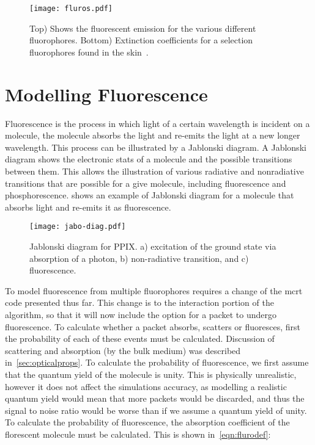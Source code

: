 

\begin{figure}[!htbp]
  \centering
  \texttt{[image: fluros.pdf]}
  \caption{Top) Shows the fluorescent emission for the various different fluorophores. Bottom) Extinction coefficients for a selection fluorophores found in the skin~\cite{prahltyro,prahltryto,soltani2019deep,sun2012biomarkers,islam2013ph,evans2013magnetic,von2012fluorescence}.}
  \label{fig:flurosshow}
\end{figure}
\FloatBarrier

\section{Modelling Fluorescence}

Fluorescence is the process in which light of a certain wavelength is incident on a molecule, the molecule absorbs the light and re-emits the light at a new longer wavelength.
This process can be illustrated by a Jablonski diagram.
A Jablonski diagram shows the electronic stats of a molecule and the possible transitions between them.
This allows the illustration of various radiative and nonradiative transitions that are possible for a give  molecule, including fluorescence and phosphorescence.
 shows an example of Jablonski diagram for a molecule that absorbs light and re-emits it as fluorescence.

\begin{figure}[!htpb]
	\centering
	\texttt{[image: jabo-diag.pdf]}
	\caption{Jablonski diagram for PPIX. a) excitation of the ground state via absorption of a photon, b) non-radiative transition, and c) fluorescence.}
	\label{fig:Jabo}
\end{figure}

To model fluorescence from multiple fluorophores requires a change of the \gls*{mcrt} code presented thus far.
This change is to the interaction portion of the algorithm, so that it will now include the option for a packet to undergo fluorescence.
To calculate whether a packet absorbs, scatters or fluoresces, first the probability of each of these events must be calculated.
Discussion of scattering and absorption (by the bulk medium) was described in~\cref{sec:opticalprops}.
To calculate the probability of fluorescence, we first assume that the quantum yield of the molecule is unity.
This is physically unrealistic, however it does not affect the simulations accuracy, as modelling a realistic quantum yield would mean that more packets would be discarded, and thus the signal to noise ratio would be worse than if we assume a quantum yield of unity.
To calculate the probability of fluorescence, the absorption coefficient of the florescent molecule must be calculated.
This is shown in~\cref{eqn:flurodef}:

